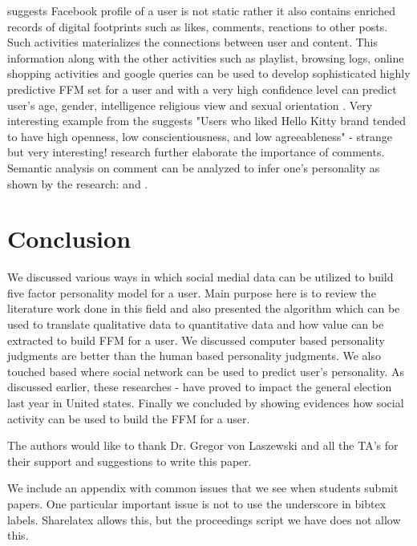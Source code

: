 \documentclass[sigconf]{acmart}
\begin{document}
\cite{ref13} suggests Facebook profile of a user is not static rather it also contains enriched records of digital footprints such as likes, comments, reactions to other posts. Such activities materializes the connections between user and content. This information along with the other activities such as playlist, browsing logs, online shopping activities and google queries can be used to develop sophisticated highly predictive FFM set for a user and with a very high confidence level can predict user’s age, gender, intelligence religious view and sexual orientation \cite{ref13}. Very interesting example from the \cite{ref13} suggests "Users who liked Hello Kitty brand tended to have high openness, low conscientiousness, and low agreeableness" - strange but very interesting! \cite{ref13} research further elaborate the importance of comments. Semantic analysis on comment can be analyzed to infer one's personality as shown by the research: \cite{ref16} and \cite{ref17}. 
 
\section{Conclusion}

We discussed various ways in which social medial data can be utilized to build five factor personality model for a user. Main purpose here is to review the literature work done in this field and also presented the algorithm which can be used to translate qualitative data to quantitative data and how value can be extracted to build FFM for a user. We discussed computer based personality judgments are better than the human based personality judgments. We also touched based where social network can be used to predict user’s personality.  As discussed earlier, these researches \cite{ref2} - \cite{ref7}  have proved to impact the general election last year in United states. Finally we concluded by showing evidences how social activity can be used to build the FFM for a user. 


\begin{acks}

  The authors would like to thank Dr. Gregor von Laszewski and all the TA's for their
  support and suggestions to write this paper. 

\end{acks}


 

\appendix

We include an appendix with common issues that we see when students
submit papers. One particular important issue is not to use the
underscore in bibtex labels. Sharelatex allows this, but the
proceedings script we have does not allow this.
\end{document}
